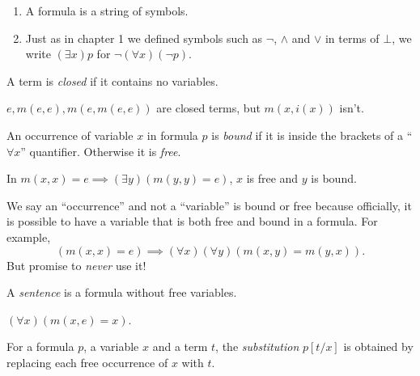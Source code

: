 \documentclass[a4paper]{article}
\begin{document}
\begin{note}\leavevmode
  \begin{enumerate}
  \item A formula is a string of symbols.
  \item Just as in chapter 1 we defined symbols such as \(\neg\), \(\land\) and \(\lor\) in terms of \(\bot\), we write \((\exists x) p\) for \(\neg (\forall x) (\neg p)\).
  \end{enumerate}
\end{note}

\begin{definition}[Closed]
  A term is \emph{closed} if it contains no variables.
\end{definition}

\begin{eg}
  \(e, m(e, e), m(e, m(e, e))\) are closed terms, but \(m(x, i(x))\) isn't.
\end{eg}

\begin{definition}
  An occurrence of variable \(x\) in formula \(p\) is \emph{bound} if it is inside the brackets of a ``\(\forall x\)'' quantifier. Otherwise it is \emph{free}.
\end{definition}

\begin{eg}
  In \(m(x, x) = e \implies (\exists y) (m(y, y) = e)\), \(x\) is free and \(y\) is bound.
\end{eg}

\begin{note}
  We say an ``occurrence'' and not a ``variable'' is bound or free because officially, it is possible to have a variable that is both free and bound in a formula. For example,
  \[
    (m(x, x) = e) \implies (\forall x)(\forall y) (m(x, y) = m(y, x)).
  \]
  But promise to \emph{never} use it!
\end{note}

\begin{definition}[Sentence]
  A \emph{sentence} is a formula without free variables.
\end{definition}

\begin{eg}
  \((\forall x) (m(x, e) = x)\).
\end{eg}

\begin{definition}[Substitution]
  For a formula \(p\), a variable \(x\) and a term \(t\), the \emph{substitution} \(p[t/x]\) is obtained by replacing each free occurrence of \(x\) with \(t\).
\end{definition}
\end{document}
